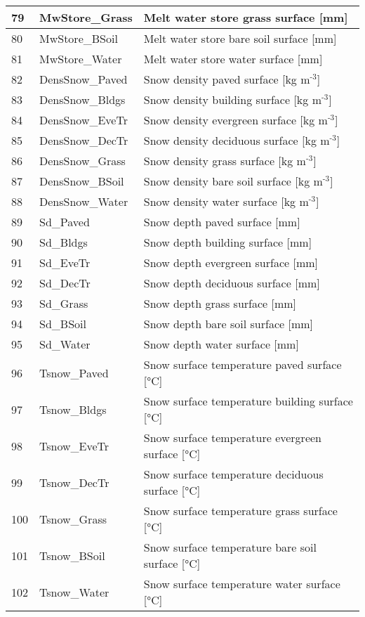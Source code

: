 \documentclass[letterpaper,10pt,english]{sphinxmanual}
\begin{document}
\begin{savenotes}
\begin{longtable}{|l|l|l|}
\hline
79
&
MwStore\_Grass
&
Melt water store \textendash{} grass surface {[}mm{]}
\\
\hline
80
&
MwStore\_BSoil
&
Melt water store \textendash{} bare soil surface {[}mm{]}
\\
\hline
81
&
MwStore\_Water
&
Melt water store \textendash{} water surface {[}mm{]}
\\
\hline
82
&
DensSnow\_Paved
&
Snow density \textendash{} paved surface {[}kg m$^{\text{-3}}${]}
\\
\hline
83
&
DensSnow\_Bldgs
&
Snow density \textendash{} building surface {[}kg m$^{\text{-3}}${]}
\\
\hline
84
&
DensSnow\_EveTr
&
Snow density \textendash{} evergreen surface {[}kg m$^{\text{-3}}${]}
\\
\hline
85
&
DensSnow\_DecTr
&
Snow density \textendash{} deciduous surface {[}kg m$^{\text{-3}}${]}
\\
\hline
86
&
DensSnow\_Grass
&
Snow density \textendash{} grass surface {[}kg m$^{\text{-3}}${]}
\\
\hline
87
&
DensSnow\_BSoil
&
Snow density \textendash{} bare soil surface {[}kg m$^{\text{-3}}${]}
\\
\hline
88
&
DensSnow\_Water
&
Snow density \textendash{} water surface {[}kg m$^{\text{-3}}${]}
\\
\hline
89
&
Sd\_Paved
&
Snow depth \textendash{} paved surface {[}mm{]}
\\
\hline
90
&
Sd\_Bldgs
&
Snow depth \textendash{} building surface {[}mm{]}
\\
\hline
91
&
Sd\_EveTr
&
Snow depth \textendash{} evergreen surface {[}mm{]}
\\
\hline
92
&
Sd\_DecTr
&
Snow depth \textendash{} deciduous surface {[}mm{]}
\\
\hline
93
&
Sd\_Grass
&
Snow depth \textendash{} grass surface {[}mm{]}
\\
\hline
94
&
Sd\_BSoil
&
Snow depth \textendash{} bare soil surface {[}mm{]}
\\
\hline
95
&
Sd\_Water
&
Snow depth \textendash{} water surface {[}mm{]}
\\
\hline
96
&
Tsnow\_Paved
&
Snow surface temperature \textendash{} paved surface {[}°C{]}
\\
\hline
97
&
Tsnow\_Bldgs
&
Snow surface temperature \textendash{} building surface {[}°C{]}
\\
\hline
98
&
Tsnow\_EveTr
&
Snow surface temperature \textendash{} evergreen surface {[}°C{]}
\\
\hline
99
&
Tsnow\_DecTr
&
Snow surface temperature \textendash{} deciduous surface {[}°C{]}
\\
\hline
100
&
Tsnow\_Grass
&
Snow surface temperature \textendash{} grass surface {[}°C{]}
\\
\hline
101
&
Tsnow\_BSoil
&
Snow surface temperature \textendash{} bare soil surface {[}°C{]}
\\
\hline
102
&
Tsnow\_Water
&
Snow surface temperature \textendash{} water surface {[}°C{]}
\\
\hline
\end{longtable}\sphinxatlongtableend\end{savenotes}
\end{document}
